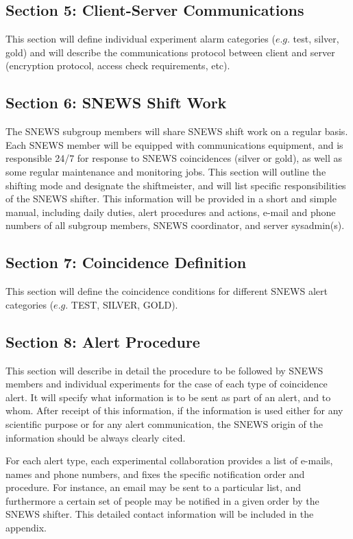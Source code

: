 \documentclass{article}
\begin{document}
\subsection*{Section 5: Client-Server Communications}

This section will define individual experiment alarm categories 
($e.g.$ test, silver, gold) and will describe the 
communications protocol between client and server (encryption
protocol, access check requirements, etc).

\subsection*{Section 6: SNEWS Shift Work}

The SNEWS subgroup members will share SNEWS shift work on a regular
basis.  Each SNEWS member will be equipped with communications
equipment,  and is responsible 24/7 for response to SNEWS coincidences
(silver or gold), as well as some regular maintenance and monitoring
jobs.  This section will outline the shifting mode and designate the
shiftmeister, and will list specific responsibilities of the SNEWS
shifter.  This information will be provided in a short and simple
manual, including daily duties, alert procedures and actions, e-mail
and phone numbers of all subgroup members, SNEWS coordinator, and
server sysadmin(s).

\subsection*{Section 7: Coincidence Definition}

This section will define the coincidence conditions for different
SNEWS alert categories ($e.g.$ TEST, SILVER, GOLD).

\subsection*{Section 8: Alert Procedure}

This section will describe in detail the procedure to be followed by
SNEWS members and individual experiments for the case of each type of
coincidence alert.  It will specify what information is to be sent as
part of an alert, and to whom.  After receipt of this information, if
the information is used either for any scientific purpose or for any
alert communication, the SNEWS origin of the information should be
always clearly cited.

For each alert type, each experimental collaboration 
provides a list of e-mails, names and phone numbers, and fixes
the specific notification order and procedure. For instance, an email may
be sent to a particular list, and furthermore a certain set of
people may be notified in a given order by the SNEWS shifter.
This detailed contact information will be included in the appendix.
\end{document}
